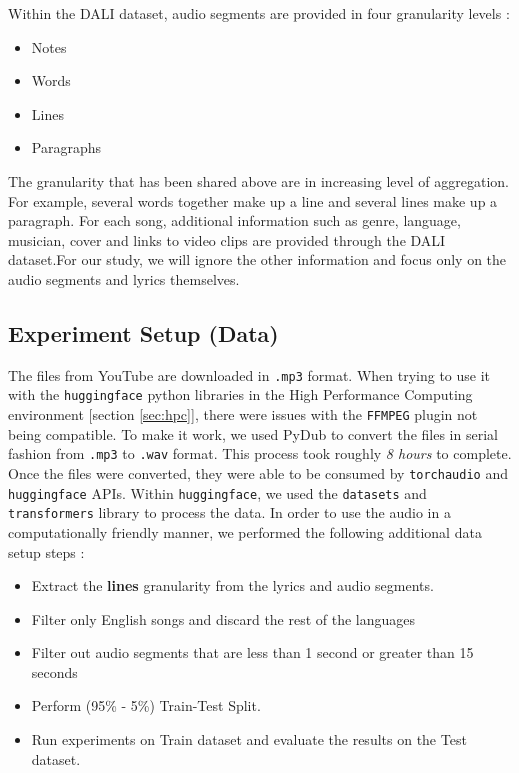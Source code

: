 Within the DALI dataset, audio segments are provided in four granularity levels :

\begin{itemize}
    \item Notes
    \item Words
    \item Lines
    \item Paragraphs
\end{itemize}

The granularity that has been shared above are in increasing level of aggregation. For example, several words together make up a line and several lines make up a paragraph. For each song, additional information such as genre, language, musician, cover and links to video clips are provided through the DALI dataset.For our study, we will ignore the other information and focus only on the audio segments and lyrics themselves.


\subsection{Experiment Setup (Data)}
\label{subsec:datasetup}

The files from YouTube are downloaded in \texttt{.mp3} format. When trying to use it with the \texttt{huggingface} python libraries in the High Performance Computing environment [section \ref{sec:hpc}], there were issues with the \texttt{FFMPEG} plugin not being compatible. To make it work, we used PyDub \cite{robert2018pydub} to convert the files in serial fashion from \texttt{.mp3} to \texttt{.wav} format. This process took roughly \textit{8 hours} to complete. Once the files were converted, they were able to be consumed by \texttt{torchaudio} and \texttt{huggingface} APIs. Within \texttt{huggingface}, we used the \texttt{datasets} and \texttt{transformers} library to process the data. In order to use the audio in a computationally friendly manner, we performed the following additional data setup steps :

\begin{itemize}
    \item Extract the \textbf{lines} granularity from the lyrics and audio segments.
    \item Filter only English songs and discard the rest of the languages
    \item Filter out audio segments that are less than 1 second or greater than 15 seconds
    \item Perform (95\% - 5\%) Train-Test Split. 
    \item Run experiments on Train dataset and evaluate the results on the Test dataset.
\end{itemize}


